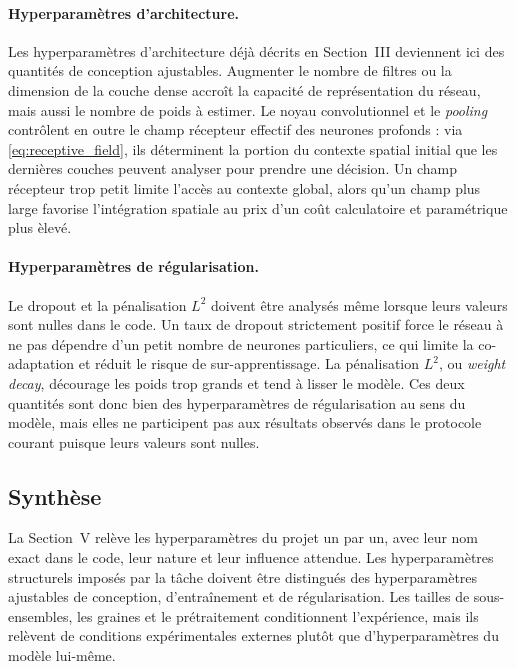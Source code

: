 \paragraph{Hyperparam\`etres d'architecture.}
Les hyperparam\`etres d'architecture d\'ej\`a d\'ecrits en Section~III deviennent ici des quantit\'es de conception ajustables. Augmenter le nombre de filtres ou la dimension de la couche dense accro\^it la capacit\'e de repr\'esentation du r\'eseau, mais aussi le nombre de poids \`a estimer. Le noyau convolutionnel et le \textit{pooling} contr\^olent en outre le champ r\'ecepteur effectif des neurones profonds : via \eqref{eq:receptive_field}, ils d\'eterminent la portion du contexte spatial initial que les derni\`eres couches peuvent analyser pour prendre une d\'ecision. Un champ r\'ecepteur trop petit limite l'acc\`es au contexte global, alors qu'un champ plus large favorise l'int\'egration spatiale au prix d'un co\^ut calculatoire et param\'etrique plus \`elev\'e.

\paragraph{Hyperparam\`etres de r\'egularisation.}
Le dropout et la p\'enalisation $L^2$ doivent \^etre analys\'es m\^eme lorsque leurs valeurs sont nulles dans le code. Un taux de dropout strictement positif force le r\'eseau \`a ne pas d\'ependre d'un petit nombre de neurones particuliers, ce qui limite la co-adaptation et r\'eduit le risque de sur-apprentissage. La p\'enalisation $L^2$, ou \textit{weight decay}, d\'ecourage les poids trop grands et tend \`a lisser le mod\`ele. Ces deux quantit\'es sont donc bien des hyperparam\`etres de r\'egularisation au sens du mod\`ele, mais elles ne participent pas aux r\'esultats observ\'es dans le protocole courant puisque leurs valeurs sont nulles.

\subsection{Synth\`ese}
La Section~V rel\`eve les hyperparam\`etres du projet un par un, avec leur nom exact dans le code, leur nature et leur influence attendue. Les hyperparam\`etres structurels impos\'es par la t\^ache doivent \^etre distingu\'es des hyperparam\`etres ajustables de conception, d'entra\^inement et de r\'egularisation. Les tailles de sous-ensembles, les graines et le pr\'etraitement conditionnent l'exp\'erience, mais ils rel\`event de conditions exp\'erimentales externes plut\^ot que d'hyperparam\`etres du mod\`ele lui-m\^eme.
